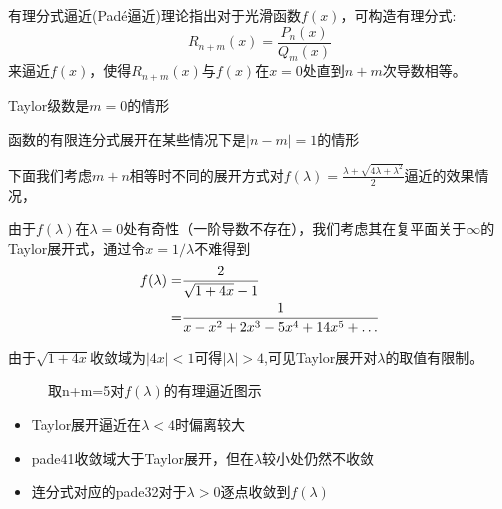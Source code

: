 \documentclass[notheorems,xetex]{beamer}
\theoremstyle{definition}
\begin{document}
\begin{frame}[noframenumbering]
有理分式逼近(Pad\'{e}逼近)理论指出对于光滑函数$f(x)$，可构造有理分式:
\[
R_{n+m}(x)=\frac{P_n(x)}{Q_m(x)}
\]
来逼近$f(x)$，使得$R_{n+m}(x)$与$f(x)$在$x=0$处直到$n+m$次导数相等。
\pause


Taylor级数是$m=0$的情形
\pause

函数的有限连分式展开在某些情况下是$|n-m|=1$的情形
\begin{flushright}
\end{flushright}
\end{frame}
\begin{frame}[noframenumbering]
下面我们考虑$m+n$相等时不同的展开方式对$f(\lambda)=\frac{\lambda+\sqrt{4\lambda+\lambda^2}}{2}$逼近的效果情况，
\pause

由于$f(\lambda)$在$\lambda=0$处有奇性（一阶导数不存在），我们考虑其在复平面关于$\infty$的Taylor展开式，通过令$x=1/\lambda$不难得到
\begin{align}\notag
f(\lambda)=&\frac{2}{\sqrt{1+4x}-1}\\
=&\frac{1}{x-x^2+2x^3-5x^4+14x^5+\dots}
\end{align}

由于$\sqrt{1+4x}$收敛域为$|4x|<1$可得$|\lambda|>4$,可见Taylor展开对$\lambda$的取值有限制。
\end{frame}
\begin{frame}[noframenumbering]
\begin{figure}
\centering
\caption*{取n+m=5对$f(\lambda)$的有理逼近图示}
\end{figure}
\begin{itemize}
  \item Taylor展开逼近在$\lambda<4$时偏离较大
  \item pade41收敛域大于Taylor展开，但在$\lambda$较小处仍然不收敛
  \item 连分式对应的pade32对于$\lambda>0$逐点收敛到$f(\lambda)$
\end{itemize}
\end{frame}
\end{document}
